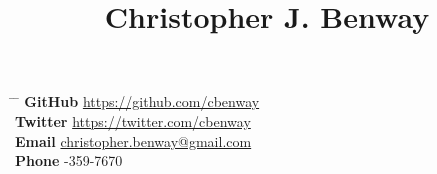 \documentclass[a4paper, 10pt]{article}
\date{\vspace{-10ex}}
\begin{document}
\title{\vspace{-12ex}Christopher J. Benway}

\maketitle


\parbox[t]{0.5\textwidth}{
}
\hfil
\parbox[t]{0.5\textwidth}{
\begin{tabbing}
\hspace{2cm} \= \hspace{4cm} \= \kill
{\bf GitHub} \> \href{https://github.com/cbenway}{https://github.com/cbenway} \\
{\bf Twitter} \> \href{https://twitter.com/cbenway}{https://twitter.com/cbenway} \\
{\bf Email} \> \href{mailto:christopher.benway@gmail.com}{christopher.benway@gmail.com} \\
{\bf Phone} -359-7670
\end{tabbing}
}

\end{document}
